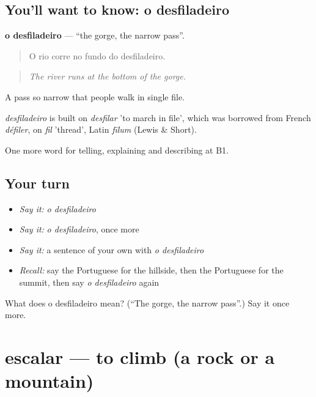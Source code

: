 \subsection*{You'll want to know: o desfiladeiro}
\textbf{o desfiladeiro} — \textquotedblleft{}the gorge, the narrow pass\textquotedblright{}.

\begin{quote}
O rio corre no fundo do desfiladeiro.
\end{quote}

\begin{quote}
\emph{The river runs at the bottom of the gorge.}
\end{quote}

A pass so narrow that people walk in single file.

\begin{cousinweb}
\emph{desfiladeiro} is built on \emph{desfilar} 'to march in file', which was borrowed from French \emph{défiler}, on \emph{fil} 'thread', Latin \emph{fīlum} (Lewis \& Short).
\end{cousinweb}

\begin{grammarlens}[title={What you've built}]
One more word for telling, explaining and describing at B1.
\end{grammarlens}

\subsection*{Your turn}
\begin{itemize}
\raggedright
  \item \emph{Say it:} \emph{o desfiladeiro}
  \item \emph{Say it:} \emph{o desfiladeiro}, once more
  \item \emph{Say it:} a sentence of your own with \emph{o desfiladeiro}
  \item \emph{Recall:} say the Portuguese for the hillside, then the Portuguese for the summit, then say \emph{o desfiladeiro} again
\end{itemize}

\begin{tcolorbox}[breakable,colback=teal!4,colframe=teal!35!black,title={Before you move on}]
What does o desfiladeiro mean? (\textquotedblleft{}The gorge, the narrow pass\textquotedblright{}.) Say it once more.
\end{tcolorbox}
\section[escalar]{escalar — to climb (a rock or a mountain)}

